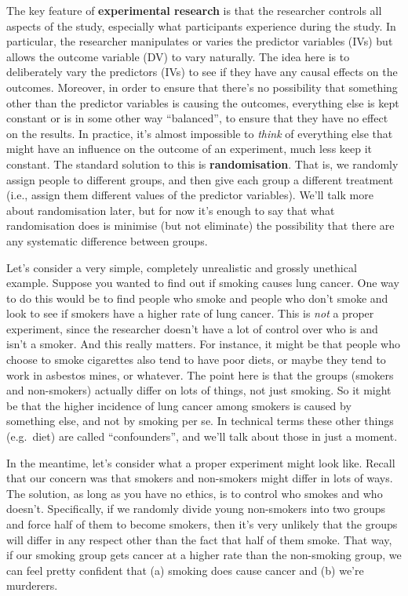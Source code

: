\documentclass[
]{book}
\begin{document}
The key feature of \textbf{experimental research} is that the researcher controls all aspects of the study, especially what participants experience during the study. In particular, the researcher manipulates or varies the predictor variables (IVs) but allows the outcome variable (DV) to vary naturally. The idea here is to deliberately vary the predictors (IVs) to see if they have any causal effects on the outcomes. Moreover, in order to ensure that there's no possibility that something other than the predictor variables is causing the outcomes, everything else is kept constant or is in some other way ``balanced'', to ensure that they have no effect on the results. In practice, it's almost impossible to \emph{think} of everything else that might have an influence on the outcome of an experiment, much less keep it constant. The standard solution to this is \textbf{randomisation}. That is, we randomly assign people to different groups, and then give each group a different treatment (i.e., assign them different values of the predictor variables). We'll talk more about randomisation later, but for now it's enough to say that what randomisation does is minimise (but not eliminate) the possibility that there are any systematic difference between groups.

Let's consider a very simple, completely unrealistic and grossly unethical example. Suppose you wanted to find out if smoking causes lung cancer. One way to do this would be to find people who smoke and people who don't smoke and look to see if smokers have a higher rate of lung cancer. This is \emph{not} a proper experiment, since the researcher doesn't have a lot of control over who is and isn't a smoker. And this really matters. For instance, it might be that people who choose to smoke cigarettes also tend to have poor diets, or maybe they tend to work in asbestos mines, or whatever. The point here is that the groups (smokers and non-smokers) actually differ on lots of things, not just smoking. So it might be that the higher incidence of lung cancer among smokers is caused by something else, and not by smoking per se. In technical terms these other things (e.g.~diet) are called ``confounders'', and we'll talk about those in just a moment.

In the meantime, let's consider what a proper experiment might look like. Recall that our concern was that smokers and non-smokers might differ in lots of ways. The solution, as long as you have no ethics, is to control who smokes and who doesn't. Specifically, if we randomly divide young non-smokers into two groups and force half of them to become smokers, then it's very unlikely that the groups will differ in any respect other than the fact that half of them smoke. That way, if our smoking group gets cancer at a higher rate than the non-smoking group, we can feel pretty confident that (a) smoking does cause cancer and (b) we're murderers.
\end{document}
